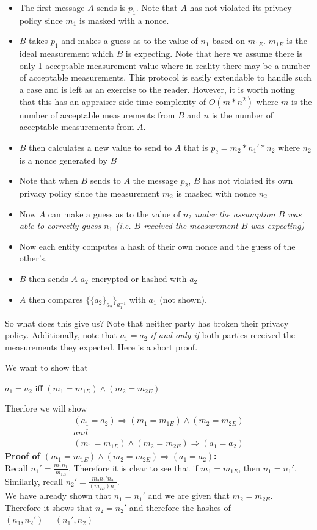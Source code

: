 \documentclass[10pt,a4paper,tikz]{article}
\begin{document}
\begin{itemize}
\item The first message $A$ sends is $p_1$. Note that $A$ has not violated its privacy policy since $m_1$ is masked with a nonce. 
\item $B$ takes $p_1$ and makes a guess as to the value of $n_1$ based on $m_{1E}$. $m_{1E}$ is the ideal measurement which $B$ is expecting. Note that here we assume there is only 1 acceptable measurement value where in reality there may be a number of acceptable measurements. This protocol is easily extendable to handle such a case and is left as an exercise to the reader. However, it is worth noting that this has an appraiser side time complexity of $O(m * n^2)$ where $m$ is the number of acceptable measurements from $B$ and $n$ is the number of acceptable measurements from $A$.
\item $B$ then calculates a new value to send to $A$ that is $p_2 = m_2*n_1'*n_2$ where $n_2$ is a nonce generated by $B$
\item Note that when $B$ sends to $A$ the message $p_2$, $B$ has not violated its own privacy policy since the measurement $m_2$ is masked with nonce $n_2$
\item Now $A$ can make a guess as to the value of $n_2$ \textit{under the assumption $B$ was able to correctly guess $n_1$ (i.e. $B$ received the measurement $B$ was expecting)}
\item Now each entity computes a hash of their own nonce and the guess of the other's.
\item $B$ then sends $A$ $a_2$ encrypted or hashed with $a_2$
\item $A$ then compares $\{\{a_2\}_{a_2}\}_{a_1^{-1}}$ with $a_1$ (not shown).
\end{itemize}

So what does this give us? Note that neither party has broken their privacy policy. Additionally, note that $a_1 = a_2$ \textit{if and only if} both parties received the measurements they expected. Here is a short proof. 

We want to show that
\begin{center}
$a_1 = a_2$  iff $(m_1 = m_{1E}) \land (m_2 = m_{2E})$
\end{center}
Therfore we will show 
\begin{align*}
 (a_1 = a_2) \Longrightarrow (m_1 = m_{1E}) \land (m_2 = m_{2E})\\
 and \\
 (m_1 = m_{1E}) \land (m_2 = m_{2E}) \Longrightarrow (a_1 = a_2)
\end{align*}
\textbf{Proof of $ (m_1 = m_{1E}) \land (m_2 = m_{2E}) \Longrightarrow (a_1 = a_2)$:}\\
Recall $n_1' = \frac {m_1n_1} {m_{1E}}$. Therefore it is clear to see that if $m_1 = m_{1E}$, then $n_1 = n_1'$. \\
Similarly, recall $n_2' = \frac{m_2n_1'n_2}{(m_{2E})n_1}$. \\
We have already shown that $n_1 = n_1'$ and we are given that $m_2 = m_{2E}$.\\
Therefore it shows that $n_2 = n_2'$ and therefore the hashes of $(n_1,n_2') = (n_1',n_2)$\\
\end{document}
